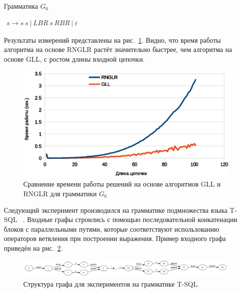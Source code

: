\documentclass[14pt]{matmex-diploma}
\begin{document}
\begin{listing}
\caption{Грамматика $G_6$}
\label{grmG6}
\centering
$\begin{array}{rl}
s \rightarrow s \ s \ |  \ LBR \ s \ RBR \ | \ \varepsilon 
\end{array}$
\end{listing}

Результаты измерений представлены на рис.~\ref{exp2}. Видно, что время работы алгоритма на основе RNGLR растёт значительно быстрее, чем алгоритма на основе GLL, с ростом длины входной цепочки. 

\begin{figure}
 \centering
 \includegraphics[width=15cm]{pics/Brs.eps}
 \caption{Сравнение времени работы решений на основе алгоритмов GLL и RNGLR для грамматики $G_6$}
 \label{exp2}
\end{figure}

Следующий эксперимент производился на грамматике подмножества языка T-SQL~\cite{YCZOO} . Входные графы строились с помощью последовательной конкатенации блоков с параллельными путями, которые соответствуют использованию операторов ветвления при построении выражения. Пример входного графа приведён на рис.~\ref{SQLInp}.

\begin{figure}
 \centering
 \includegraphics[width=15cm]{pics/SQLInput}
 \caption{Структура графа для экспериментов на грамматике T-SQL}
 \label{SQLInp}
\end{figure}
\end{document}
